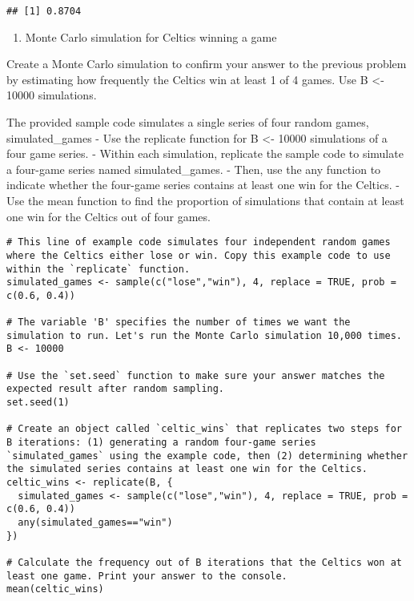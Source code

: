 \documentclass[
]{article}
\providecommand{\tightlist}{%
  \setlength{\itemsep}{0pt}\setlength{\parskip}{0pt}}
\begin{document}
\begin{verbatim}
## [1] 0.8704
\end{verbatim}

\begin{enumerate}
\def\labelenumi{\arabic{enumi}.}
\setcounter{enumi}{4}
\tightlist
\item
  Monte Carlo simulation for Celtics winning a game
\end{enumerate}

Create a Monte Carlo simulation to confirm your answer to the previous
problem by estimating how frequently the Celtics win at least 1 of 4
games. Use B \textless- 10000 simulations.

The provided sample code simulates a single series of four random games,
simulated\_games - Use the replicate function for B \textless- 10000
simulations of a four game series. - Within each simulation, replicate
the sample code to simulate a four-game series named simulated\_games. -
Then, use the any function to indicate whether the four-game series
contains at least one win for the Celtics. - Use the mean function to
find the proportion of simulations that contain at least one win for the
Celtics out of four games.

\begin{verbatim}
# This line of example code simulates four independent random games where the Celtics either lose or win. Copy this example code to use within the `replicate` function.
simulated_games <- sample(c("lose","win"), 4, replace = TRUE, prob = c(0.6, 0.4))

# The variable 'B' specifies the number of times we want the simulation to run. Let's run the Monte Carlo simulation 10,000 times.
B <- 10000

# Use the `set.seed` function to make sure your answer matches the expected result after random sampling.
set.seed(1)

# Create an object called `celtic_wins` that replicates two steps for B iterations: (1) generating a random four-game series `simulated_games` using the example code, then (2) determining whether the simulated series contains at least one win for the Celtics.
celtic_wins <- replicate(B, {
  simulated_games <- sample(c("lose","win"), 4, replace = TRUE, prob = c(0.6, 0.4))
  any(simulated_games=="win")
})

# Calculate the frequency out of B iterations that the Celtics won at least one game. Print your answer to the console.
mean(celtic_wins)
\end{verbatim}
\end{document}
